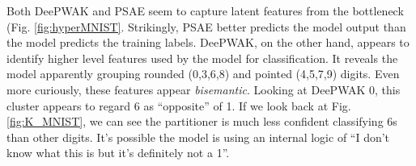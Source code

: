 Both DeePWAK and PSAE seem to capture latent features from the bottleneck (Fig. \ref{fig:hyperMNIST}.
Strikingly, PSAE better predicts the model output than the model predicts the training labels.
DeePWAK, on the other hand, appears to identify higher level features used by the model for classification.
It reveals the model apparently grouping rounded (0,3,6,8) and pointed (4,5,7,9) digits. 
Even more curiously, these features appear \textit{bisemantic}.
Looking at \textsf{DeePWAK 0}, this cluster appears to regard 6 as ``opposite'' of 1.
If we look back at Fig. \ref{fig:K_MNIST}, we can see the partitioner is much less confident classifying 6s than other digits.
It's possible the model is using an internal logic of ``I don't know what this is but it's definitely not a 1''.


